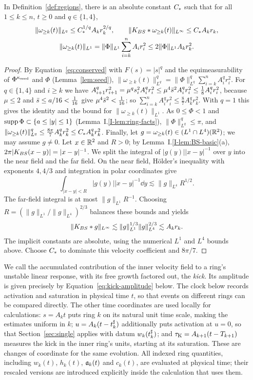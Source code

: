 \begin{lemma}
\label{lem:speed}
In Definition~\ref{def:regions}, there is an absolute constant $C_{*}$ such that for all $1\le k\le n$, $t\ge0$ and $q\in\{1,4\}$,
\[
\begin{gathered}
\|\omega_{\ge k}(t)\|_{L^q}\le C_{*}^{1/q}A_kr_k^{2/q},\qquad
\|K_{BS}\ast\omega_{\ge k}(t)\|_{L^\infty}\le C_{*} A_kr_k,\\
\|\omega_{\ge k}(t)\|_{L^1}=\|\Phi\|_{L^1}\sum_{i=k}^nA_ir_i^2\le2\|\Phi\|_{L^1}A_kr_k^2 .
\end{gathered}
\]
\end{lemma}
\begin{proof}
By Equation~\eqref{eq:conserved} with $F(s)=|s|^q$ and the equimeasurability of
$\Phi^{\kappa_{\mathrm{seed}}}$ and $\Phi$ (Lemma~\ref{lem:seed}),
$\|\omega_{\ge k}(t)\|_{L^q}^q=\|\Phi\|_{L^q}^q\sum_{i=k}^nA_i^qr_i^2$. For
$q\in\{1,4\}$ and $i\ge k$ we have
$A_{i+1}^qr_{i+1}^2=\mu^qs_i^2A_i^qr_i^2\le\mu^4\bar s^2A_i^qr_i^2\le\frac18A_i^qr_i^2$,
because $\mu\le2$ and $\bar s\le a/16<\frac1{16}$ give $\mu^4\bar s^2<\frac1{16}$;
so $\sum_{i=k}^nA_i^qr_i^2\le\frac87A_k^qr_k^2$. With $q=1$ this gives the
identity and the bound for $\|\omega_{\ge k}(t)\|_{L^1}$. As $0\le\Phi<1$ and
$\operatorname{supp}\Phi\subset\{a\le|y|\le1\}$ (Lemma~I.\ref{I-lem:ring-facts}), $\|\Phi\|_{L^q}^q\le\pi$, and
$\|\omega_{\ge k}(t)\|_{L^q}^q\le\frac{8\pi}7A_k^qr_k^2\le C_{*} A_k^qr_k^2$.
Finally, let $g=\omega_{\ge k}(t)\in (L^1\cap L^4)(\mathbb{R}^2)$; we may assume $g\ne0$. Let
$x\in\mathbb{R}^2$ and $R>0$; by Lemma~I.\ref{I-lem:BS-basic}(a), $2\pi|K_{BS}(x-y)|=|x-y|^{-1}$.
We split the integral of $|g(y)||x-y|^{-1}$ over $y$ into the near field and the
far field.
On the near field, H\"older's inequality with exponents $4,4/3$ and
integration in polar coordinates give
\[
\int_{|x-y|<R}|g(y)||x-y|^{-1}\dd y\lesssim\|g\|_{L^4}R^{1/2}.
\]
The far-field integral is at most $\|g\|_{L^1}R^{-1}$. Choosing
$R=(\|g\|_{L^1}/\|g\|_{L^4})^{2/3}$ balances these bounds and yields
\[
\|K_{BS}\ast g\|_{L^\infty}
\lesssim\|g\|_{L^1}^{1/3}\|g\|_{L^4}^{2/3}
\lesssim A_kr_k.
\]
The implicit constants are absolute, using the numerical $L^1$ and $L^4$
bounds above. Choose $C_{*}$ to dominate this velocity coefficient and $8\pi/7$.
\end{proof}

We call the accumulated contribution of the inner velocity field to a ring's
unstable linear response, with its free growth factored out, the \emph{kick}.
Its amplitude is given precisely by Equation~\eqref{eq:kick-amplitude} below.
The clock below records activation and saturation in physical time $t$,
so that events on different rings can be compared directly. The other time
coordinates are used locally for calculations: $s=A_kt$ puts ring $k$ on its
natural unit time scale, making the estimates uniform in $k$;
$u=A_k(t-t^\sharp_k)$ additionally puts activation at $u=0$, so that Section~\ref{sec:single}
applies with datum $w_k(t^\sharp_k)$; and
$\tau_{\mathrm{K}}=A_{k+1}(t-T_{k+1})$ measures the kick in the inner ring's units, starting
at its saturation. These are changes of coordinate for the same evolution.
All indexed ring quantities, including $w_k(t)$, $h_k(t)$, $\mathfrak{a}_k(t)$ and
$c_k(t)$, are evaluated at physical time; their rescaled versions are
introduced explicitly inside the calculation that uses them.

